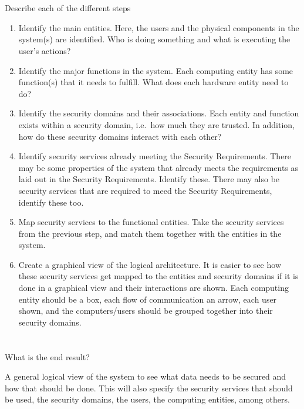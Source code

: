 \begin{questions}
\begin{parts}
  \part{} Describe each of the different steps
    \begin{solution}
      \begin{enumerate}[noitemsep]
      \item Identify the main entities.
        Here, the users and the physical components in the system(s) are identified.
        Who is doing something and what is executing the user's actions?
      \item Identify the major functions in the system.
        Each computing entity has some function(s) that it needs to fulfill.
        What does each hardware entity need to do?
      \item Identify the security domains and their associations.
        Each entity and function exists within a security domain, i.e.\ how much they are trusted.
        In addition, how do these security domains interact with each other?
      \item Identify security services already meeting the Security Requirements.
        There may be some properties of the system that already meets the requirements as laid out in the Security Requirements.
        Identify these.
        There may also be security services that are required to meed the Security Requirements, identify these too.
      \item Map security services to the functional entities.
        Take the security services from the previous step, and match them together with the entities in the system.
      \item Create a graphical view of the logical architecture.
        It is easier to see how these security services get mapped to the entities and security domains if it is done in a graphical view and their interactions are shown.
        Each computing entity should be a box, each flow of communication an arrow, each user shown, and the computers/users should be grouped together into their security domains.
      \end{enumerate}
    \end{solution}

  \part{} What is the end result?
    \begin{solution}
      A general logical view of the system to see what data needs to be secured and how that should be done.
      This will also specify the security services that should be used, the security domains, the users, the computing entities, among others.
    \end{solution}


\end{parts}
\end{questions}
